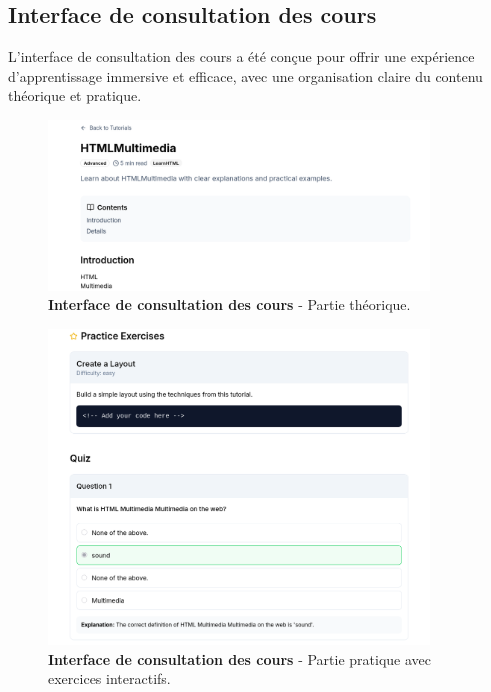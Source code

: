 \subsection{Interface de consultation des cours}

L'interface de consultation des cours a été conçue pour offrir une expérience d'apprentissage immersive et efficace, avec une organisation claire du contenu théorique et pratique.

\begin{figure}[h!]
  \centering
  \includegraphics[width=0.9\textwidth,keepaspectratio]{week_3_img/part1.png}
  \caption{\textbf{Interface de consultation des cours} - Partie théorique.}
  \label{fig:course_theory}
\end{figure}

\begin{figure}[h!]
  \centering
  \includegraphics[width=0.9\textwidth,keepaspectratio]{week_3_img/part2.png}
  \caption{\textbf{Interface de consultation des cours} - Partie pratique avec exercices interactifs.}
  \label{fig:course_practice}
\end{figure}

